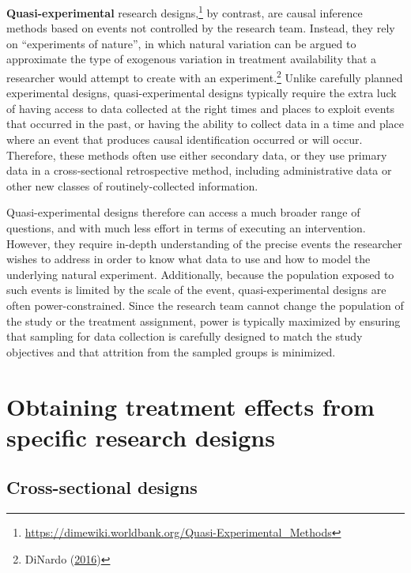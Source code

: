 \documentclass[
]{book}
\begin{document}
\textbf{Quasi-experimental} research designs,\footnote{\url{https://dimewiki.worldbank.org/Quasi-Experimental_Methods}}
by contrast, are causal inference methods based on events not controlled by the research team.
Instead, they rely on ``experiments of nature'',
in which natural variation can be argued to approximate
the type of exogenous variation in treatment availability
that a researcher would attempt to create with an experiment.\footnote{DiNardo (\protect\hyperlink{ref-dinardo2016natural}{2016})}
Unlike carefully planned experimental designs,
quasi-experimental designs typically require the extra luck
of having access to data collected at the right times and places
to exploit events that occurred in the past,
or having the ability to collect data in a time and place
where an event that produces causal identification occurred or will occur.
Therefore, these methods often use either secondary data,
or they use primary data in a cross-sectional retrospective method,
including administrative data or other new classes of routinely-collected information.

Quasi-experimental designs therefore can access a much broader range of questions,
and with much less effort in terms of executing an intervention.
However, they require in-depth understanding of the precise events
the researcher wishes to address in order to know what data to use
and how to model the underlying natural experiment.
Additionally, because the population exposed
to such events is limited by the scale of the event,
quasi-experimental designs are often power-constrained.
Since the research team cannot change the population of the study
or the treatment assignment, power is typically maximized by ensuring
that sampling for data collection is carefully designed to match the study objectives
and that attrition from the sampled groups is minimized.

\hypertarget{obtaining-treatment-effects-from-specific-research-designs}{%
\section*{Obtaining treatment effects from specific research designs}\label{obtaining-treatment-effects-from-specific-research-designs}}

\hypertarget{cross-sectional-designs}{%
\subsection*{Cross-sectional designs}\label{cross-sectional-designs}}
\end{document}
